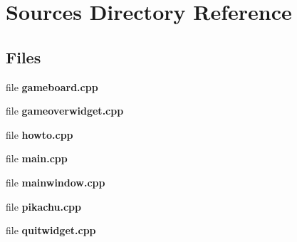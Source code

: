 \section{Sources Directory Reference}
\label{dir_937900b87e0c7a5fa01190c395fb83f7}
\subsection*{Files}
\begin{DoxyCompactItemize}
\item 
file {\bf gameboard.\+cpp}
\item 
file {\bf gameoverwidget.\+cpp}
\item 
file {\bf howto.\+cpp}
\item 
file {\bf main.\+cpp}
\item 
file {\bf mainwindow.\+cpp}
\item 
file {\bf pikachu.\+cpp}
\item 
file {\bf quitwidget.\+cpp}
\end{DoxyCompactItemize}
